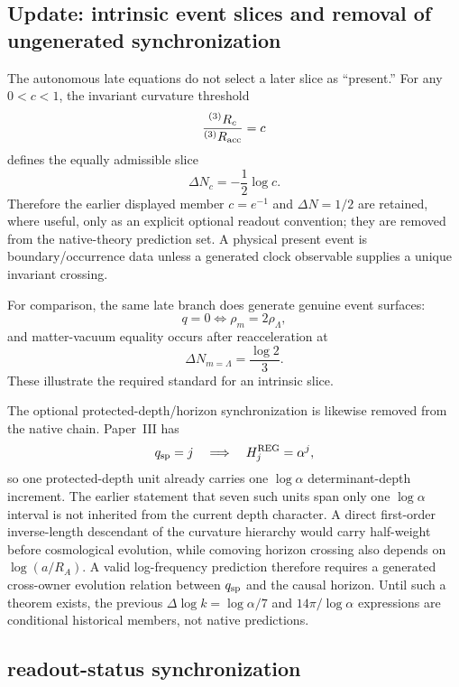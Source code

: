 \documentclass[12pt,a4paper]{article}
\begin{document}


\subsection{Update: intrinsic event slices and removal of ungenerated synchronization}
\label{p9:sec:g10-update}

The autonomous late equations do not select a later slice as ``present.''  For
any $0<c<1$, the invariant curvature threshold
\[
 \frac{{}^{(3)}R_c}{{}^{(3)}R_{\rm acc}}=c
\]
defines the equally admissible slice
\[
 \Delta N_c=-\frac12\log c.
\]
Therefore the earlier displayed member $c=e^{-1}$ and
$\Delta N=1/2$ are retained, where useful, only as an explicit optional
readout convention; they are removed from the native-theory prediction set.
A physical present event is boundary/occurrence data unless a generated clock
observable supplies a unique invariant crossing.

For comparison, the same late branch does generate genuine event surfaces:
\[
 q=0\iff\rho_m=2\rho_\Lambda,
\]
and matter-vacuum equality occurs after reacceleration at
\[
 \boxed{\Delta N_{m=\Lambda}=\frac{\log2}{3}}.
\]
These illustrate the required standard for an intrinsic slice.

The optional protected-depth/horizon synchronization is likewise removed from
the native chain.  Paper~III has
\[
 q_{\rm sp}=j\quad\Longrightarrow\quad H_j^{\rm REG}=\alpha^j,
\]
so one protected-depth unit already carries one $\log\alpha$ determinant-depth
increment.  The earlier statement that seven such units span only one
$\log\alpha$ interval is not inherited from the current depth character.
A direct first-order inverse-length descendant of the curvature hierarchy
would carry half-weight before cosmological evolution, while comoving
horizon crossing also depends on $\log(a/R_A)$.  A valid log-frequency
prediction therefore requires a generated cross-owner evolution relation
between $q_{\rm sp}$ and the causal horizon.  Until such a theorem exists, the
previous $\Delta\log k=\log\alpha/7$ and $14\pi/\log\alpha$ expressions are
conditional historical members, not native predictions.


\subsection{readout-status synchronization}
\label{p9:sec:post-v125-readout-status}
\end{document}

